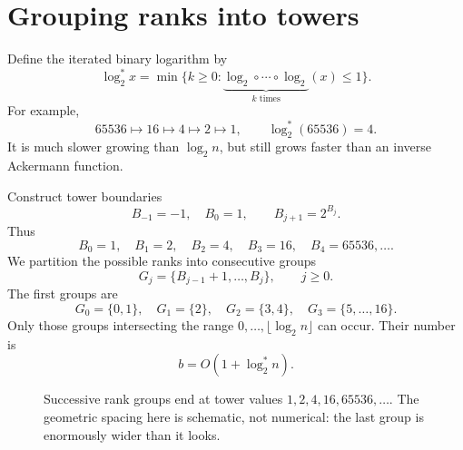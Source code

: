 \section{Grouping ranks into towers}

Define the iterated binary logarithm by
\[
 \log_2^*x=
 \min\bigl\{k\geq0:
    \underbrace{\log_2\circ\cdots\circ\log_2}_{k\text{ times}}(x)
       \leq1\bigr\}.
\]
For example,
\[
 65536\longmapsto16\longmapsto4
 \longmapsto2\longmapsto1,
 \qquad\log_2^*(65536)=4.
\]
It is much slower growing than \(\log_2n\), but still grows faster than an inverse Ackermann function.

Construct tower boundaries
\begin{equation}
 B_{-1}=-1,\quad B_0=1,\qquad
 B_{j+1}=2^{B_j}.
 \label{eq:N20261108-towers}
\end{equation}
Thus
\[
 B_0=1,\quad B_1=2,\quad B_2=4,\quad
 B_3=16,\quad B_4=65536,\ldots.
\]
We partition the possible ranks into consecutive groups
\[
 G_j=\{B_{j-1}+1,\ldots,B_j\},
 \qquad j\geq0.
\]
The first groups are
\[
 G_0=\{0,1\},\quad G_1=\{2\},\quad
 G_2=\{3,4\},\quad G_3=\{5,\ldots,16\}.
\]
Only those groups intersecting the range \(0,\ldots,\lfloor\log_2n\rfloor\) can occur. Their number is
\[
 b=O(1+\log_2^*n).
\]

\begin{figure}[htbp]
\centering
{}
\caption{Successive rank groups end at tower values \(1,2,4,16,65536,\ldots\). The geometric spacing here is schematic, not numerical: the last group is enormously wider than it looks.}
\label{fig:N20261108-rankblocks}
\end{figure}

